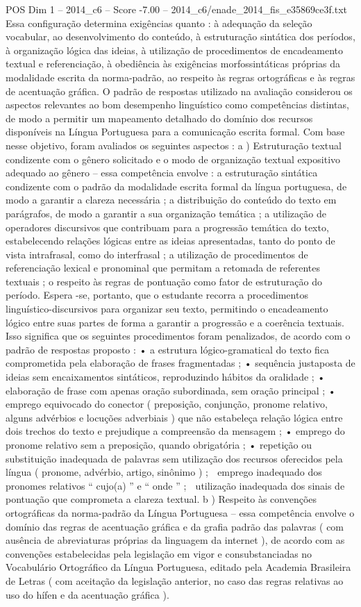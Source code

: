 \begin{textsample}{POS Dim 1 – 2014\_c6 – Score -7.00 – 2014\_c6/enade\_2014\_fis\_e35869ce3f.txt}
Essa configuração determina exigências quanto : à adequação da seleção vocabular, ao desenvolvimento do conteúdo, à estruturação sintática dos períodos, à organização lógica das ideias, à utilização de procedimentos de encadeamento textual e referenciação, à obediência às exigências morfossintáticas próprias da modalidade escrita da norma-padrão, ao respeito às regras ortográficas e às regras de acentuação gráfica.
O padrão de respostas utilizado na avaliação considerou os aspectos relevantes ao bom desempenho linguístico como competências distintas, de modo a permitir um mapeamento detalhado do domínio dos recursos disponíveis na Língua Portuguesa para a comunicação escrita formal.
Com base nesse objetivo, foram avaliados os seguintes aspectos : a ) Estruturação textual condizente com o gênero solicitado e o modo de organização textual expositivo adequado ao gênero – essa competência envolve : a estruturação sintática condizente com o padrão da modalidade escrita formal da língua portuguesa, de modo a garantir a clareza necessária ; a distribuição do conteúdo do texto em parágrafos, de modo a garantir a sua organização temática ; a utilização de operadores discursivos que contribuam para a progressão temática do texto, estabelecendo relações lógicas entre as ideias apresentadas, tanto do ponto de vista intrafrasal, como do interfrasal ; a utilização de procedimentos de referenciação lexical e pronominal que permitam a retomada de referentes textuais ; o respeito às regras de pontuação como fator de estruturação do período.
Espera -se, portanto, que o estudante recorra a procedimentos linguístico-discursivos para organizar seu texto, permitindo o encadeamento lógico entre suas partes de forma a garantir a progressão e a coerência textuais.
Isso significa que os seguintes procedimentos foram penalizados, de acordo com o padrão de respostas proposto : • a estrutura lógico-gramatical do texto fica comprometida pela elaboração de frases fragmentadas ; • sequência justaposta de ideias sem encaixamentos sintáticos, reproduzindo hábitos da oralidade ; • elaboração de frase com apenas oração subordinada, sem oração principal ; • emprego equivocado do conector ( preposição, conjunção, pronome relativo, alguns advérbios e locuções adverbiais ) que não estabeleça relação lógica entre dois trechos do texto e prejudique a compreensão da mensagem ; • emprego do pronome relativo sem a preposição, quando obrigatória ; • repetição ou substituição inadequada de palavras sem utilização dos recursos oferecidos pela língua ( pronome, advérbio, artigo, sinônimo ) ;  emprego inadequado dos pronomes relativos “ cujo(a) ” e “ onde ” ;  utilização inadequada dos sinais de pontuação que comprometa a clareza textual. b ) Respeito às convenções ortográficas da norma-padrão da Língua Portuguesa – essa competência envolve o domínio das regras de acentuação gráfica e da grafia padrão das palavras ( com ausência de abreviaturas próprias da linguagem da internet ), de acordo com as convenções estabelecidas pela legislação em vigor e consubstanciadas no Vocabulário Ortográfico da Língua Portuguesa, editado pela Academia Brasileira de Letras ( com aceitação da legislação anterior, no caso das regras relativas ao uso do hífen e da acentuação gráfica ).

\end{textsample}
